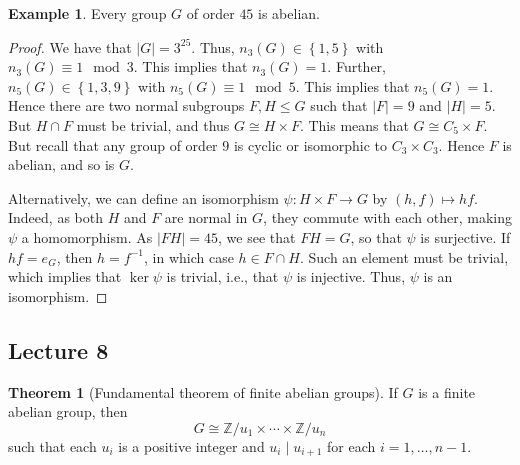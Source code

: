 \documentclass[10pt,letterpaper,cm]{nupset}
\theoremstyle{definition}
\newtheorem{exmp}[definition]{Example}
\theoremstyle{theorem}
\newtheorem{theorem}[definition]{Theorem}
\theoremstyle{remark}
\newcommand{\Z}{\mathbb Z}
\newcommand{\1}{\mathbf{1}}
\newcommand{\0}{\vec 0}
\begin{document}
\begin{exmp}
Every group $G$ of order $45$ is abelian.
\end{exmp}
\begin{proof}
We have that $\lvert{G}\rvert = 3^25$.  Thus, $n_3(G) \in \left\{1, 5\right\}$ with $n_3(G) \equiv 1\mod 3$. This implies that $n_3(G) = 1$. Further, $n_5(G) \in \left\{1, 3, 9\right\}$ with $n_5(G) \equiv 1 \mod 5$. This implies that $n_5(G) =1$. Hence there are two normal subgroups $F, H\leq G$ such that $\lvert{F}\rvert =9$ and $\lvert{H}\rvert =5$. But $H \cap F$ must be trivial, and thus $G\cong H \times F$. This means that $G \cong C_5 \times F$. But recall that any group of order $9$ is cyclic or isomorphic to $C_3 \times C_3$. Hence $F$ is abelian, and so is $G$. 

Alternatively, we can define an isomorphism $\psi: H \times F \to G$ by $\left(h,f\right) \mapsto hf$. Indeed, as both $H$ and $F$ are normal in $G$, they commute with each other, making $\psi$ a homomorphism. As $\lvert{FH}\rvert = 45$, we see that $FH=G$, so that $\psi$ is surjective. If $hf =e_G$, then $h= f^{-1}$, in which case $h\in F \cap H$. Such an element must be trivial, which implies that $\ker{\psi}$ is trivial, i.e., that $\psi$ is injective. Thus, $\psi$ is an isomorphism.
\end{proof}

\subsection{Lecture 8}

\begin{theorem}[Fundamental theorem of finite abelian groups]\label{FTFAG}
If $G$ is a finite abelian group, then $$ G \cong \Z/u_1 \times \cdots \times \Z/u_n$$ such that each $u_i$ is a positive integer and $u_i \mid u_{i+1}$ for each $i=1, \ldots, n-1$.
\end{theorem}
\end{document}
